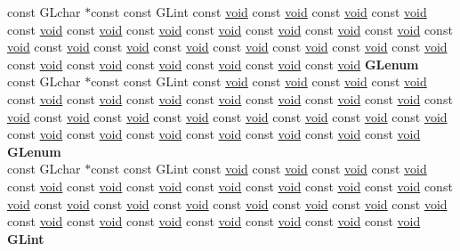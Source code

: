 \begin{DoxyCompactItemize}
\begin{tabbing}
\>const GLchar $\ast$const const GLint const \hyperlink{interfacevoid}{void} const \hyperlink{interfacevoid}{void} const \hyperlink{interfacevoid}{void} const \hyperlink{interfacevoid}{void} const \hyperlink{interfacevoid}{void} const \hyperlink{interfacevoid}{void} const \hyperlink{interfacevoid}{void} const \hyperlink{interfacevoid}{void} const \hyperlink{interfacevoid}{void} const \hyperlink{interfacevoid}{void} const \hyperlink{interfacevoid}{void} const \hyperlink{interfacevoid}{void} const \hyperlink{interfacevoid}{void} const \hyperlink{interfacevoid}{void} const \hyperlink{interfacevoid}{void} const \hyperlink{interfacevoid}{void} const \hyperlink{interfacevoid}{void} const \hyperlink{interfacevoid}{void} const \hyperlink{interfacevoid}{void} const \hyperlink{interfacevoid}{void} const \hyperlink{interfacevoid}{void} const \hyperlink{interfacevoid}{void} const \hyperlink{interfacevoid}{void} const \hyperlink{interfacevoid}{void} const \hyperlink{interfacevoid}{void} {\bfseries GLenum}\\
\>const GLchar $\ast$const const GLint const \hyperlink{interfacevoid}{void} const \hyperlink{interfacevoid}{void} const \hyperlink{interfacevoid}{void} const \hyperlink{interfacevoid}{void} const \hyperlink{interfacevoid}{void} const \hyperlink{interfacevoid}{void} const \hyperlink{interfacevoid}{void} const \hyperlink{interfacevoid}{void} const \hyperlink{interfacevoid}{void} const \hyperlink{interfacevoid}{void} const \hyperlink{interfacevoid}{void} const \hyperlink{interfacevoid}{void} const \hyperlink{interfacevoid}{void} const \hyperlink{interfacevoid}{void} const \hyperlink{interfacevoid}{void} const \hyperlink{interfacevoid}{void} const \hyperlink{interfacevoid}{void} const \hyperlink{interfacevoid}{void} const \hyperlink{interfacevoid}{void} const \hyperlink{interfacevoid}{void} const \hyperlink{interfacevoid}{void} const \hyperlink{interfacevoid}{void} const \hyperlink{interfacevoid}{void} const \hyperlink{interfacevoid}{void} const \hyperlink{interfacevoid}{void} const \hyperlink{interfacevoid}{void} {\bfseries GLenum}\\
\>const GLchar $\ast$const const GLint const \hyperlink{interfacevoid}{void} const \hyperlink{interfacevoid}{void} const \hyperlink{interfacevoid}{void} const \hyperlink{interfacevoid}{void} const \hyperlink{interfacevoid}{void} const \hyperlink{interfacevoid}{void} const \hyperlink{interfacevoid}{void} const \hyperlink{interfacevoid}{void} const \hyperlink{interfacevoid}{void} const \hyperlink{interfacevoid}{void} const \hyperlink{interfacevoid}{void} const \hyperlink{interfacevoid}{void} const \hyperlink{interfacevoid}{void} const \hyperlink{interfacevoid}{void} const \hyperlink{interfacevoid}{void} const \hyperlink{interfacevoid}{void} const \hyperlink{interfacevoid}{void} const \hyperlink{interfacevoid}{void} const \hyperlink{interfacevoid}{void} const \hyperlink{interfacevoid}{void} const \hyperlink{interfacevoid}{void} const \hyperlink{interfacevoid}{void} const \hyperlink{interfacevoid}{void} const \hyperlink{interfacevoid}{void} const \hyperlink{interfacevoid}{void} const \hyperlink{interfacevoid}{void} {\bfseries GLint}\\

\end{tabbing}
\end{DoxyCompactItemize}
